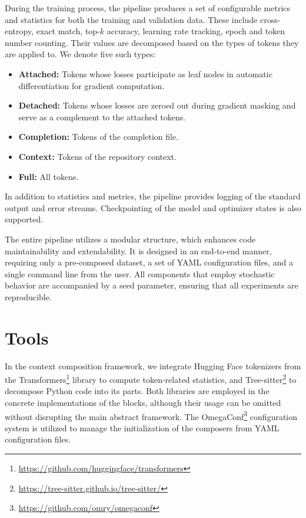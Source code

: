 During the training process, the pipeline produces a set of configurable metrics and statistics for both the training and validation data. These include cross-entropy, exact match, top-\(k\) accuracy, learning rate tracking, epoch and token number counting. Their values are decomposed based on the types of tokens they are applied to. We denote five such types:
\begin{itemize}
    \item \textbf{Attached:} Tokens whose losses participate as leaf nodes in automatic differentiation for gradient computation.
    \item \textbf{Detached:} Tokens whose losses are zeroed out during gradient masking and serve as a complement to the attached tokens.
    \item \textbf{Completion:} Tokens of the completion file.
    \item \textbf{Context:} Tokens of the repository context.
    \item \textbf{Full:} All tokens.
\end{itemize}

In addition to statistics and metrics, the pipeline provides logging of the standard output and error streams. Checkpointing of the model and optimizer states is also supported.

The entire pipeline utilizes a modular structure, which enhances code maintainability and extendability. It is designed in an end-to-end manner, requiring only a pre-composed dataset, a set of YAML configuration files, and a single command line from the user. All components that employ stochastic behavior are accompanied by a seed parameter, ensuring that all experiments are reproducible.

\section{Tools}

In the context composition framework, we integrate Hugging Face tokenizers from the Transformers\footnote{\url{https://github.com/huggingface/transformers}} library to compute token-related statistics, and Tree-sitter\footnote{\url{https://tree-sitter.github.io/tree-sitter/}} to decompose Python code into its parts. Both libraries are employed in the concrete implementations of the blocks, although their usage can be omitted without disrupting the main abstract framework. The OmegaConf\footnote{\url{https://github.com/omry/omegaconf}} configuration system is utilized to manage the initialization of the composers from YAML configuration files.

